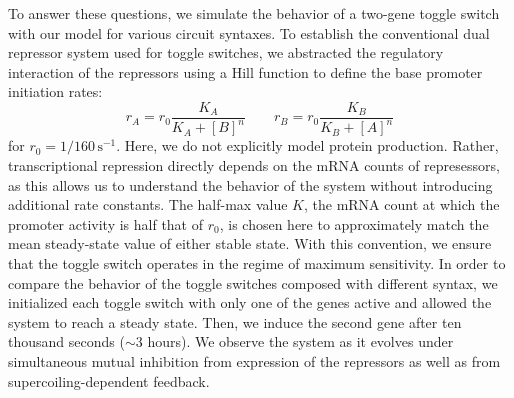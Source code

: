 \documentclass[11pt]{article}
\begin{document}
To answer these questions, we simulate the behavior of a two-gene toggle switch with our model for various circuit syntaxes. To establish the conventional dual repressor system used for toggle switches, we abstracted the regulatory interaction of the repressors using a Hill function to define the base promoter initiation rates:
\begin{equation}
    r_A = r_0 \frac{K_A}{K_A + [B]^n} \qquad r_B = r_0 \frac{K_B}{K_B + [A]^n}
\end{equation}
for \(r_0 = 1/160 \,\text{s}^{-1}\). Here, we do not explicitly model protein production. Rather, transcriptional repression directly depends on the mRNA counts of represessors, as this allows us to understand the behavior of the system without introducing additional rate constants. The half-max value \(K\), the mRNA count at which the promoter activity is half that of \(r_0\), is chosen here to approximately match the mean steady-state value of either stable state. With this convention, we ensure that the toggle switch operates in the regime of maximum sensitivity. In order to compare the behavior of the toggle switches composed with different syntax, we initialized each toggle switch with only one of the genes active and allowed the system to reach a steady state. Then, we induce the second gene after ten thousand seconds (\(\sim3\) hours). We observe the system as it evolves under simultaneous mutual inhibition from expression of the repressors as well as from supercoiling-dependent feedback.
\end{document}

